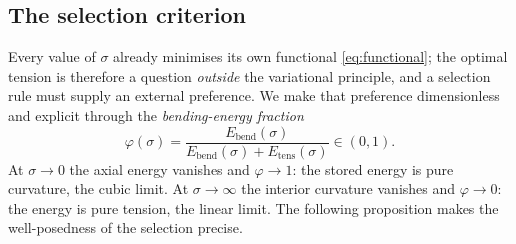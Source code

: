 \documentclass[10pt]{article}
\begin{document}
\subsection{The selection criterion}
Every value of $\sigma$ already minimises its own functional \eqref{eq:functional}; the optimal
tension is therefore a question \emph{outside} the variational principle, and a selection rule
must supply an external preference. We make that preference dimensionless and explicit through
the \emph{bending-energy fraction}
\begin{equation}
\varphi(\sigma)=\frac{E_{\mathrm{bend}}(\sigma)}{E_{\mathrm{bend}}(\sigma)+E_{\mathrm{tens}}(\sigma)}\in(0,1).
\label{eq:phi}
\end{equation}
At $\sigma\to0$ the axial energy vanishes and $\varphi\to1$: the stored energy is pure
curvature, the cubic limit. At $\sigma\to\infty$ the interior curvature vanishes and
$\varphi\to0$: the energy is pure tension, the linear limit. The following proposition makes
the well-posedness of the selection precise.
\end{document}
